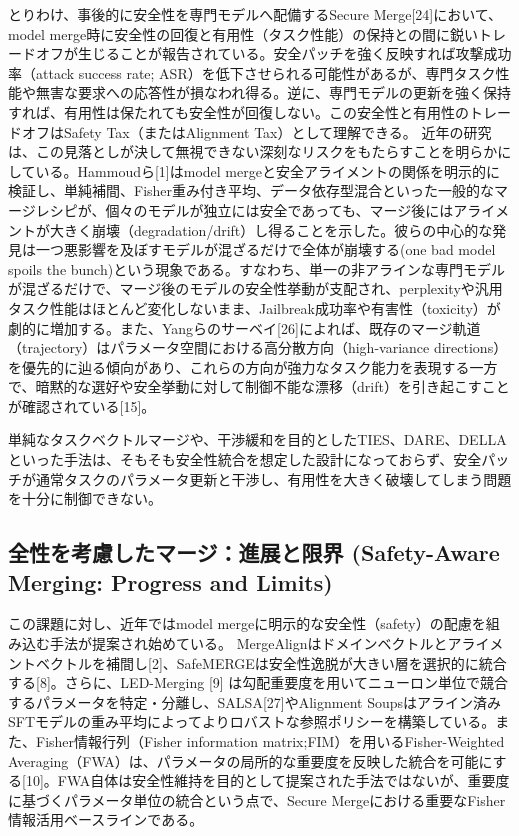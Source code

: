 \documentclass{article}
\begin{document}
とりわけ、事後的に安全性を専門モデルへ配備するSecure Merge[24]において、model merge時に安全性の回復と有用性（タスク性能）の保持との間に鋭いトレードオフが生じることが報告されている。安全パッチを強く反映すれば攻撃成功率（attack success rate; ASR）を低下させられる可能性があるが、専門タスク性能や無害な要求への応答性が損なわれ得る。逆に、専門モデルの更新を強く保持すれば、有用性は保たれても安全性が回復しない。この安全性と有用性のトレードオフはSafety Tax（またはAlignment Tax）として理解できる。
近年の研究は、この見落としが決して無視できない深刻なリスクをもたらすことを明らかにしている。Hammoudら[1]はmodel mergeと安全アライメントの関係を明示的に検証し、単純補間、Fisher重み付き平均、データ依存型混合といった一般的なマージレシピが、個々のモデルが独立には安全であっても、マージ後にはアライメントが大きく崩壊（degradation/drift）し得ることを示した。彼らの中心的な発見は一つ悪影響を及ぼすモデルが混ざるだけで全体が崩壊する(one bad model spoils the bunch)という現象である。すなわち、単一の非アラインな専門モデルが混ざるだけで、マージ後のモデルの安全性挙動が支配され、perplexityや汎用タスク性能はほとんど変化しないまま、Jailbreak成功率や有害性（toxicity）が劇的に増加する。また、Yangらのサーベイ[26]によれば、既存のマージ軌道（trajectory）はパラメータ空間における高分散方向（high-variance directions）を優先的に辿る傾向があり、これらの方向が強力なタスク能力を表現する一方で、暗黙的な選好や安全挙動に対して制御不能な漂移（drift）を引き起こすことが確認されている[15]。

単純なタスクベクトルマージや、干渉緩和を目的としたTIES、DARE、DELLAといった手法は、そもそも安全性統合を想定した設計になっておらず、安全パッチが通常タスクのパラメータ更新と干渉し、有用性を大きく破壊してしまう問題を十分に制御できない。


\subsection{全性を考慮したマージ：進展と限界 (Safety-Aware Merging: Progress and Limits)}
この課題に対し、近年ではmodel mergeに明示的な安全性（safety）の配慮を組み込む手法が提案され始めている。
MergeAlignはドメインベクトルとアライメントベクトルを補間し[2]、SafeMERGEは安全性逸脱が大きい層を選択的に統合する[8]。さらに、LED-Merging [9] は勾配重要度を用いてニューロン単位で競合するパラメータを特定・分離し、SALSA[27]やAlignment Soupsはアライン済みSFTモデルの重み平均によってよりロバストな参照ポリシーを構築している。また、Fisher情報行列（Fisher information matrix;FIM）を用いるFisher-Weighted Averaging（FWA）は、パラメータの局所的な重要度を反映した統合を可能にする[10]。FWA自体は安全性維持を目的として提案された手法ではないが、重要度に基づくパラメータ単位の統合という点で、Secure Mergeにおける重要なFisher情報活用ベースラインである。
\end{document}

